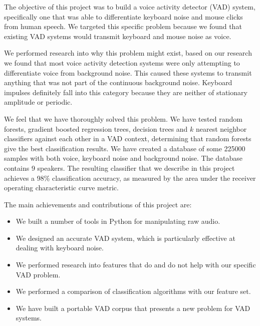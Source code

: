 \documentclass[ %
                    author={Sam Phippen},
                supervisor={Dr. Rafal Bogacz},
                     title={Real time voice activity detectors in noisy personal computing environments},
                  subtitle={},
                    degree={MEng},
                      year={2012} ]{thesis}
\begin{document}
The objective of this project was to build a voice activity detector (VAD)
system, specifically one that was able to differentiate keyboard noise and
mouse clicks from human speech. We targeted this specific problem because
we found that existing VAD systems would transmit keyboard and mouse noise
as voice.

We performed research into why this problem might exist, based on our research
we found that most voice activity detection systems were only attempting to
differentiate voice from background noise. This caused these systems to
transmit anything that was not part of the continuous background noise.
Keyboard impulses definitely fall into this category because they are neither
of stationary amplitude or periodic.

We feel that we have thoroughly solved this problem. We have tested random
forests, gradient boosted regression trees, decision trees and $k$ nearest
neighbor classifiers against each other in a VAD context, determining that
random forests give the best classification results. We have created a database
of some 225000 samples with both voice, keyboard noise and background noise.
The database contains 9 speakers. The resulting classifier that we describe in
this project achieves a 98\% classification accuracy, as measured by the area
under the receiver operating characteristic curve metric.

The main achievements and contributions of this project are:

\begin{itemize}

    \item We built a number of tools in Python for manipulating raw audio.

    \item We designed an accurate VAD system, which is particularly
        effective at dealing with keyboard noise.

    \item We performed research into features that do and do not help
        with our specific VAD problem.

    \item We performed a comparison of classification algorithms with our
        feature set.

    \item We have built a portable VAD corpus that presents a new problem for
        VAD systems.

\end{itemize}
\end{document}
